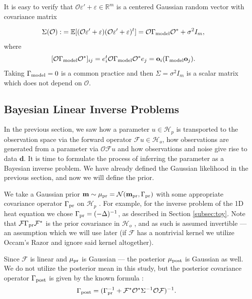 \documentclass[ba]{imsart}
\newcommand{\R}{\ensuremath{\mathbb{R}}}
\newcommand{\eps}{\varepsilon}
\newcommand{\hilp}{\mathcal{H}_p}
\newcommand{\hilo}{\mathcal{H}_o}
\newcommand{\obs}{\mathcal{O}}
\newcommand{\fwd}{\mathcal{F}}
\newcommand{\data}{\mathbf{d}}
\newcommand{\param}{\mathbf{m}}
\newcommand{\normal}{\mathcal{N}}
\newcommand{\pr}{\mu_{\textup{pr}}} \newcommand{\post}{\mu_{\textup{post}}} \newcommand{\prmean}{\param_{\textup{pr}}} \newcommand{\postmean}{\param_{\textup{post}}} \newcommand{\postcov}{\Gamma_{\textup{post}}} \newcommand{\prcov}{\Gamma_{\textup{pr}}} \newcommand{\modcov}{\Gamma_{\textup{model}}} \newcommand{\tmp}{\mathcal{G}}
\newcommand{\meas}{\mathbf{o}}
\theoremstyle{plain}
\theoremstyle{definition}
\theoremstyle{remark}
\begin{document}
It is easy to verify that \(\obs \eps' + \eps \in \R^m\) is a centered
Gaussian random vector with covariance matrix

\begin{align}\label{eq:Sigma}
  \begin{split}
    \Sigma(\obs) :&= \mathbb{E}[ (\obs \eps' + \eps) (\obs \eps' +
      \eps)^t ]
= \obs \modcov \obs^* + \sigma^2I_m , 
  \end{split}
\end{align}
where
\begin{align}\label{eq:modcov_explained}
  \begin{split}
    [\obs \modcov \obs^*]_{ij} & = e_i^t \obs \modcov \obs^* e_j 
= \meas_i (\modcov \meas_j).\end{split}
\end{align}
Taking \(\modcov = 0\) is a common practice
\cite{tarantola2005,kaipio2005,Vogel02} and then \(\Sigma =
\sigma^2I_m\) is a scalar matrix which does not depend on \(\obs\).

\subsection{Bayesian Linear Inverse Problems}\label{subsec:bayesian_inverse_problems}
In the previous section, we saw how a parameter $u\in \hilp$ is
transported to the observation space via the forward operator $\fwd u
\in \hilo$, how observations are generated from a parameter via $\obs
\fwd u$ and how observations and noise give rise to data $\data$. It
is time to formulate the process of inferring the parameter as a
Bayesian inverse problem. We have already defined the Gaussian
likelihood in the previous section, and now we will define the prior.

We take a Gaussian prior \(\param \sim \pr = \normal(\prmean
,\prcov)\) with some appropriate covariance operator \(\prcov\) on
\(\hilp\) \cite{Stuart10}. For example, for the inverse problem of the
1D heat equation we chose $\prcov = (-\Delta)^{-1}$, as described in
Section \ref{subsec:toy}. Note that \(\fwd \prcov \fwd^*\) is the
prior covariance in \(\hilo\) \cite{Stuart10}, and as such is assumed
invertible --- an assumption which we will use later (if \(\fwd\) has
a nontrivial kernel we utilize Occam's Razor and ignore said kernel
altogether).

Since $\fwd$ is linear and $\pr$ is Gaussian --- the posterior
\(\post\) is Gaussian as well. We do not utilize the posterior mean in
this study, but the posterior covariance operator $\postcov$ is given
by the known formula \cite{Stuart10}:
\begin{align}\label{eq:postcov}
  \postcov = (\prcov^{-1} + \fwd^* \obs^* \Sigma^{-1} \obs \fwd
  )^{-1}.
\end{align}
\end{document}
